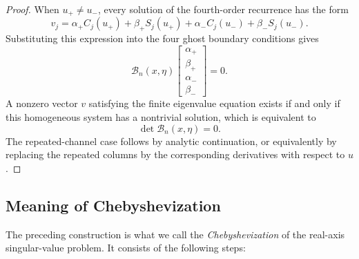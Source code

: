 \documentclass[11pt]{amsart}
\numberwithin{equation}{section}
\begin{document}
\begin{proof}
When \(u_+\ne u_-\), every solution of the fourth-order recurrence has the
form
\[
        v_j
        =
        \alpha_+ C_j(u_+)
        +\beta_+ S_j(u_+)
        +\alpha_- C_j(u_-)
        +\beta_- S_j(u_-).
\]
Substituting this expression into the four ghost boundary conditions gives
\[
        \mathcal B_n(x,\eta)
        \begin{bmatrix}
        \alpha_+\\ \beta_+\\ \alpha_-\\ \beta_-
        \end{bmatrix}
        =
        0.
\]
A nonzero vector \(v\) satisfying the finite eigenvalue equation exists if
and only if this homogeneous system has a nontrivial solution, which is
equivalent to
\[
        \det\mathcal B_n(x,\eta)=0.
\]
The repeated-channel case follows by analytic continuation, or equivalently
by replacing the repeated columns by the corresponding derivatives with
respect to \(u\).
\end{proof}

\subsection{Meaning of Chebyshevization}

The preceding construction is what we call the \emph{Chebyshevization} of the
real-axis singular-value problem.  It consists of the following steps:
\end{document}
